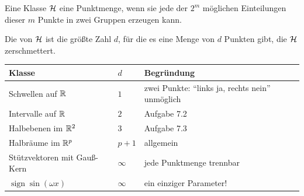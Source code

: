 \begin{definition}
Eine Klasse $\mathcal{H}$  eine Punktmenge, wenn sie jede der $2^{m}$ möglichen Einteilungen dieser $m$ Punkte in zwei Gruppen erzeugen kann.

Die  von $\mathcal{H}$ ist die größte Zahl $d$, für die es eine Menge von $d$ Punkten gibt, die $\mathcal{H}$ zerschmettert.
\end{definition}

\begin{merksatz}
\begin{center}
{\small
\renewcommand{\arraystretch}{1.55}
\begin{tabular}{@{}P{3.4cm}P{1.4cm}P{3.4cm}@{}}
\toprule
\textbf{Klasse} & $d$ & \textbf{Begründung}\\
\midrule
Schwellen auf $\mathbb{R}$ & $1$ & zwei Punkte: \enquote{links ja, rechts nein} unmöglich\\
Intervalle auf $\mathbb{R}$ & $2$ & Aufgabe 7.2\\
Halbebenen im $\mathbb{R}^{2}$ & $3$ & Aufgabe 7.3\\
Halbräume im $\mathbb{R}^{p}$ & $p+1$ & allgemein\\
Stützvektoren mit Gauß-Kern & $\infty$ & jede Punktmenge trennbar\\
$\operatorname{sign}\sin(\omega x)$ & $\infty$ & \textcolor{akzent}{ein einziger Parameter!}\\
\bottomrule
\end{tabular}}
\end{center}

\begin{center}
\begin{minipage}{0.88\textwidth}
\end{minipage}
\end{center}

\begin{center}
\begin{minipage}{0.88\textwidth}
\end{minipage}
\end{center}
\end{merksatz}

